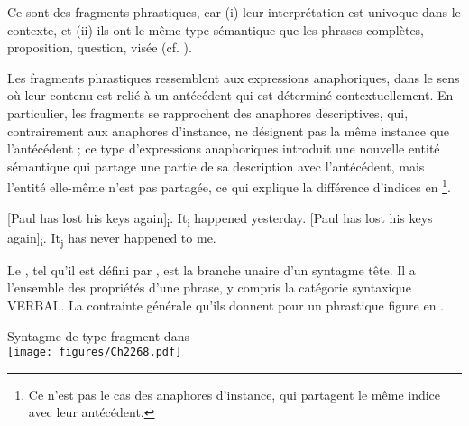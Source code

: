 Ce sont des fragments phrastiques, car (i) leur interprétation est univoque dans le contexte, et (ii) ils ont le même type sémantique que les phrases complètes, {{\cad}} proposition, question, visée (cf. \citealt{GinzburgEtAl2000}).

Les fragments phrastiques ressemblent aux expressions anaphoriques, dans le sens où leur contenu est relié à un antécédent qui est déterminé contextuellement. En particulier, les fragments se rapprochent des anaphores descriptives, qui, contrairement aux anaphores d’instance, ne désignent pas la même instance que l’antécédent ; ce type d’expressions anaphoriques introduit une nouvelle entité sémantique qui partage une partie de sa description avec l’antécédent, mais l’entité elle-même n’est pas partagée, ce qui explique la différence d’indices en \footnote{
 Ce n’est pas le cas des anaphores d’instance, qui partagent le même indice avec leur antécédent.}.

\ea \label{ch2:ex267}
\ea{} [Paul has lost his keys again]\textsubscript{i}. It\textsubscript{i} happened yesterday. \label{ch2:ex267a}
\ex{} [Paul has lost his keys again]\textsubscript{i}. It\textsubscript{j} has never happened to me. \label{ch2:ex267b} 
\z
\z

Le , tel qu’il est défini par \citet{GinzburgEtAl2000}, est la branche unaire d’un syntagme tête. Il a l’ensemble des propriétés d’une phrase, y compris la catégorie syntaxique VERBAL. La contrainte générale qu’ils donnent pour un  phrastique figure en .

\ea \label{ch2:ex268}
Syntagme de type fragment dans \citet{GinzburgEtAl2000}\\
\texttt{[image: figures/Ch2268.pdf]}


